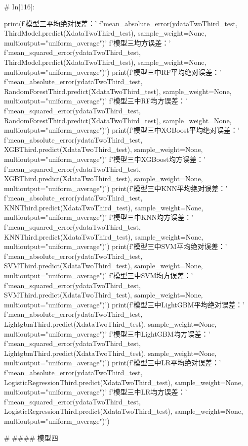 \documentclass{MathorCupmodeling}
\begin{document}
\begin{python}
	# In[116]:
	
	
	print(f'模型三平均绝对误差：'
		  f'{mean_absolute_error(ydataTwoThird_test, ThirdModel.predict(XdataTwoThird_test), sample_weight=None, multioutput="uniform_average")}\n'
		  f'模型三均方误差：'
		  f'{mean_squared_error(ydataTwoThird_test, ThirdModel.predict(XdataTwoThird_test), sample_weight=None, multioutput="uniform_average")}')
	print(f'模型三中RF平均绝对误差：'
		  f'{mean_absolute_error(ydataTwoThird_test, RandomForestThird.predict(XdataTwoThird_test), sample_weight=None, multioutput="uniform_average")}\n'
		  f'模型三中RF均方误差：'
		  f'{mean_squared_error(ydataTwoThird_test, RandomForestThird.predict(XdataTwoThird_test), sample_weight=None, multioutput="uniform_average")}')
	print(f'模型三中XGBoost平均绝对误差：'
		  f'{mean_absolute_error(ydataTwoThird_test, XGBThird.predict(XdataTwoThird_test), sample_weight=None, multioutput="uniform_average")}\n'
		  f'模型三中XGBoost均方误差：'
		  f'{mean_squared_error(ydataTwoThird_test, XGBThird.predict(XdataTwoThird_test), sample_weight=None, multioutput="uniform_average")}')
	print(f'模型三中KNN平均绝对误差：'
		  f'{mean_absolute_error(ydataTwoThird_test, KNNThird.predict(XdataTwoThird_test), sample_weight=None, multioutput="uniform_average")}\n'
		  f'模型三中KNN均方误差：'
		  f'{mean_squared_error(ydataTwoThird_test, KNNThird.predict(XdataTwoThird_test), sample_weight=None, multioutput="uniform_average")}')
	print(f'模型三中SVM平均绝对误差：'
		  f'{mean_absolute_error(ydataTwoThird_test, SVMThird.predict(XdataTwoThird_test), sample_weight=None, multioutput="uniform_average")}\n'
		  f'模型三中SVM均方误差：'
		  f'{mean_squared_error(ydataTwoThird_test, SVMThird.predict(XdataTwoThird_test), sample_weight=None, multioutput="uniform_average")}')
	print(f'模型三中LightGBM平均绝对误差：'
		  f'{mean_absolute_error(ydataTwoThird_test, LightgbmThird.predict(XdataTwoThird_test), sample_weight=None, multioutput="uniform_average")}\n'
		  f'模型三中LightGBM均方误差：'
		  f'{mean_squared_error(ydataTwoThird_test, LightgbmThird.predict(XdataTwoThird_test), sample_weight=None, multioutput="uniform_average")}')
	print(f'模型三中LR平均绝对误差：'
		  f'{mean_absolute_error(ydataTwoThird_test, LogisticRegressionThird.predict(XdataTwoThird_test), sample_weight=None, multioutput="uniform_average")}\n'
		  f'模型三中LR均方误差：'
		  f'{mean_squared_error(ydataTwoThird_test, LogisticRegressionThird.predict(XdataTwoThird_test), sample_weight=None, multioutput="uniform_average")}')
	
	# #### 模型四
	

\end{python}
\end{document}
